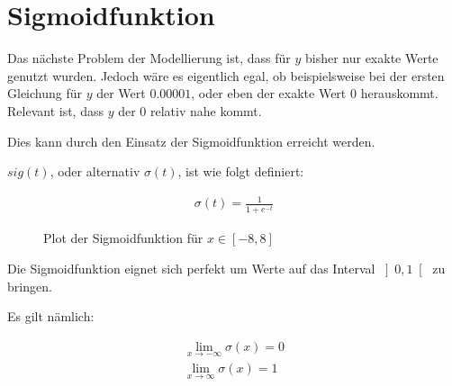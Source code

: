 \documentclass[a4paper]{report}
\begin{document}
\section{Sigmoidfunktion}
\begin{flushleft}   
Das nächste Problem der Modellierung ist, dass für $y$ bisher nur exakte Werte genutzt wurden.
Jedoch wäre es eigentlich egal, ob beispielsweise bei der ersten Gleichung für $y$ der Wert $0.00001$, oder eben der exakte Wert $0$ herauskommt.
Relevant ist, dass $y$ der $0$ relativ nahe kommt.

Dies kann durch den Einsatz der Sigmoidfunktion erreicht werden.

$sig(t)$, oder alternativ $\sigma(t)$, ist wie folgt definiert:
\end{flushleft}
\begin{align}
    \sigma(t)=\frac{1}{1+e^{-t}}
\end{align}

\begin{figure}[ht]
    \centering
    \caption{Plot der Sigmoidfunktion für $x\in\left[-8,8\right]$}
    \label{fig:sigplot}
\end{figure}

\begin{flushleft}   
Die Sigmoidfunktion eignet sich perfekt um Werte auf das Interval $\left]0,1\right[$ zu bringen.

Es gilt nämlich:
\end{flushleft}
\begin{align}
    \lim_{x\to-\infty} \sigma(x) = 0 \\
    \lim_{x\to\infty} \sigma(x) = 1
\end{align}
\end{document}
